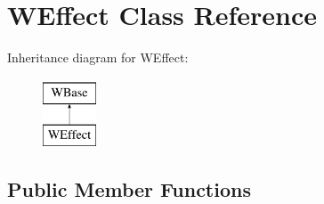 \hypertarget{class_w_effect}{}\section{W\+Effect Class Reference}
\label{class_w_effect}
Inheritance diagram for W\+Effect\+:\begin{figure}[H]
\begin{center}
\leavevmode
\includegraphics[height=2.000000cm]{class_w_effect}
\end{center}
\end{figure}
\subsection*{Public Member Functions}
